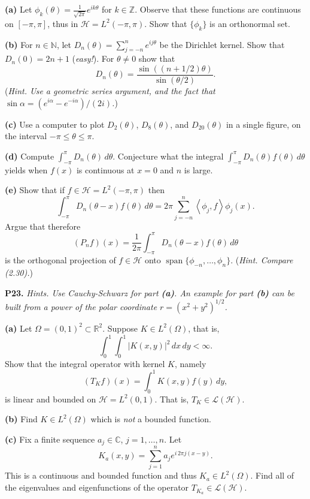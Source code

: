 \documentclass[12pt]{amsart}
\newcommand{\cH}{\mathcal{H}}
\newcommand{\cL}{\mathcal{L}}
\newcommand{\CC}{\mathbb{C}}
\newcommand{\NN}{\mathbb{N}}
\newcommand{\RR}{\mathbb{R}}
\newcommand{\ZZ}{\mathbb{Z}}
\newcommand{\ip}[2]{\ensuremath{\left<#1,#2\right>}}
\newcommand{\Span}{\operatorname{span}}
\newcommand{\prob}[1]{\bigskip\noindent\textbf{#1.}\quad }
\newcommand{\epart}[1]{\medskip\noindent\textbf{(#1)}\quad }
\newcommand{\ds}{\displaystyle}
\begin{document}
\epart{a}  Let $\ds \phi_k(\theta) = \frac{1}{\sqrt{2 \pi}} e^{ik\theta}$ for $k\in\ZZ$.  Observe that these functions are continuous on $[-\pi,\pi]$, thus in $\cH=L^2(-\pi,\pi)$.  Show that $\{\phi_k\}$ is an orthonormal set.

\epart{b}  For $n\in\NN$, let $\ds D_n(\theta) = \sum_{j=-n}^n e^{ij\theta}$ be the Dirichlet kernel.  Show that $D_n(0)=2n+1$ (\emph{easy!}).  For $\theta\ne 0$ show that
	$$D_n(\theta) = \frac{\sin\left((n+1/2)\theta\right)}{\sin(\theta/2)}.$$
(\emph{Hint.  Use a geometric series argument, and the fact that $\sin \alpha = (e^{i\alpha} - e^{-i\alpha})/(2i)$.})

\epart{c}  Use a computer to plot $D_2(\theta)$, $D_8(\theta)$, and $D_{20}(\theta)$ in a single figure, on the interval $-\pi \le \theta \le \pi$.

\epart{d}  Compute $\ds \int_{-\pi}^\pi D_n(\theta)\,d\theta$.  Conjecture what the integral $\ds \int_{-\pi}^\pi D_n(\theta) f(\theta)\,d\theta$ yields when $f(x)$ is continuous at $x=0$ and $n$ is large.

\epart{e}  Show that if $f\in\cH=L^2(-\pi,\pi)$ then
	$$\int_{-\pi}^\pi D_n(\theta - x) f(\theta)\,d\theta = 2\pi \sum_{j=-n}^n \ip{\phi_j}{f} \phi_j(x).$$
Argue that therefore
	$$(P_n f)(x) = \frac{1}{2\pi} \int_{-\pi}^\pi D_n(\theta - x) f(\theta)\,d\theta$$
is the orthogonal projection of $f \in \cH$ onto $\Span\{\phi_{-n},\dots,\phi_n\}$.  (\emph{Hint. Compare (2.30).})


\prob{P23}  \emph{Hints.  Use Cauchy-Schwarz for part \emph{\textbf{(a)}}.  An example for part \emph{\textbf{(b)}} can be built from a power of the polar coordinate $r=(x^2+y^2)^{1/2}$.}

\epart{a}  Let $\Omega=(0,1)^2 \subset \RR^2$.  Suppose $K \in L^2(\Omega)$, that is,
	$$\int_0^1 \int_0^1 |K(x,y)|^2\,dx\,dy < \infty.$$
Show that the integral operator with kernel $K$, namely
	$$(T_K f)(x) = \int_0^1 K(x,y) f(y)\,dy,$$
is linear and bounded on $\cH = L^2(0,1)$.  That is, $T_K \in\cL(\cH)$.

\epart{b} Find $K \in L^2(\Omega)$ which is \emph{not} a bounded function.

\epart{c} Fix a finite sequence $a_j\in\CC$, $j=1,\dots,n$.  Let
    $$K_{a}(x,y) = \sum_{j=1}^n a_j e^{i \,2\pi j(x-y)}.$$
This is a continuous and bounded function and thus $K_a \in L^2(\Omega)$.  Find all of the eigenvalues and eigenfunctions of the operator $T_{K_a} \in \cL(\cH)$.
\end{document}
